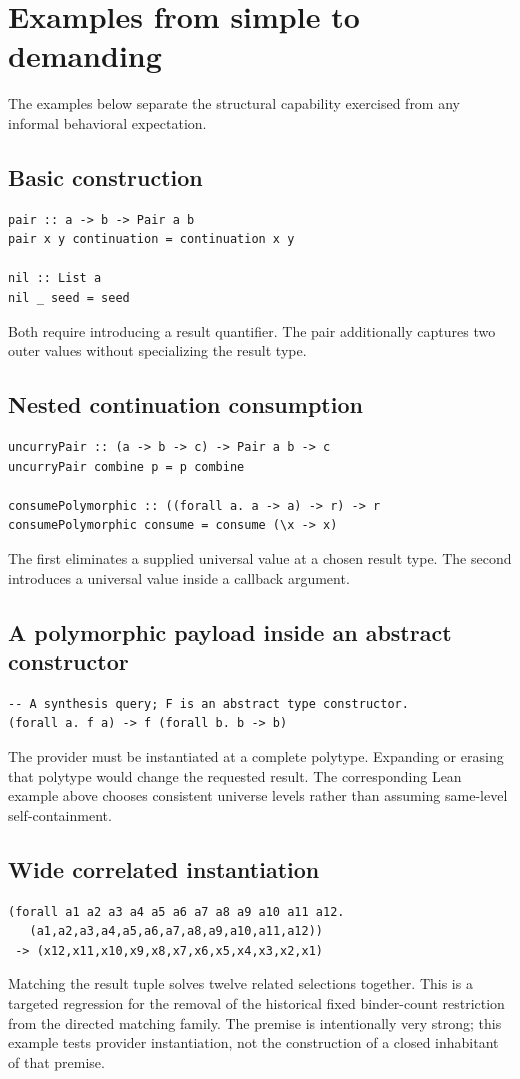 \documentclass[11pt]{article}
\begin{document}
\section{Examples from simple to demanding}

The examples below separate the structural capability exercised from any
informal behavioral expectation.

\subsection{Basic construction}
\begin{lstlisting}
pair :: a -> b -> Pair a b
pair x y continuation = continuation x y

nil :: List a
nil _ seed = seed
\end{lstlisting}
Both require introducing a result quantifier. The pair additionally captures
two outer values without specializing the result type.

\subsection{Nested continuation consumption}
\begin{lstlisting}
uncurryPair :: (a -> b -> c) -> Pair a b -> c
uncurryPair combine p = p combine

consumePolymorphic :: ((forall a. a -> a) -> r) -> r
consumePolymorphic consume = consume (\x -> x)
\end{lstlisting}
The first eliminates a supplied universal value at a chosen result type. The
second introduces a universal value inside a callback argument.

\subsection{A polymorphic payload inside an abstract constructor}
\begin{lstlisting}
-- A synthesis query; F is an abstract type constructor.
(forall a. f a) -> f (forall b. b -> b)
\end{lstlisting}
The provider must be instantiated at a complete polytype. Expanding or
erasing that polytype would change the requested result. The corresponding
Lean example above chooses consistent universe levels rather than assuming
same-level self-containment.

\subsection{Wide correlated instantiation}
\begin{lstlisting}
(forall a1 a2 a3 a4 a5 a6 a7 a8 a9 a10 a11 a12.
   (a1,a2,a3,a4,a5,a6,a7,a8,a9,a10,a11,a12))
 -> (x12,x11,x10,x9,x8,x7,x6,x5,x4,x3,x2,x1)
\end{lstlisting}
Matching the result tuple solves twelve related selections together. This is
a targeted regression for the removal of the historical fixed binder-count
restriction from the directed matching family. The premise is intentionally
very strong; this example tests provider instantiation, not the construction
of a closed inhabitant of that premise.
\end{document}
